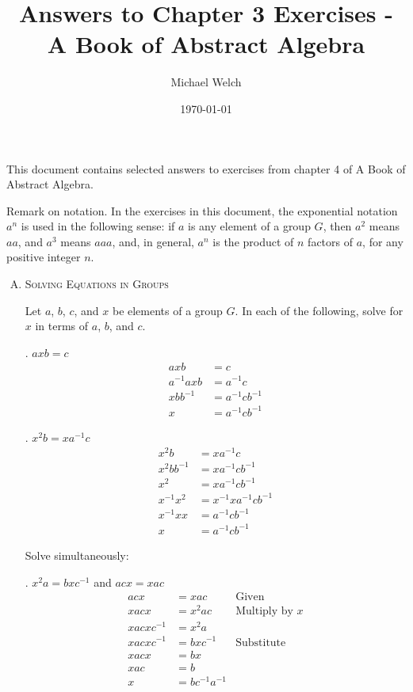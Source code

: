 \documentclass[twoside]{amsart}
\begin{document}
\title{Answers to Chapter 3 Exercises - A Book of Abstract Algebra}
\author{Michael Welch}
\date{\today}
\maketitle

This document contains selected answers to exercises from chapter 4
of A Book of Abstract Algebra.

Remark on notation. In the exercises in this document, the exponential
notation $a^n$ is used in the following sense: if $a$ is any element of
a group $G$, then $a^2$ means $aa$, and $a^3$ means $aaa$, and, in
general, $a^n$ is the product of $n$ factors of $a$, for any positive
integer $n$.

\begin{enumerate}[A.]
   \item \textsc{Solving Equations in Groups}

   \noindent Let $a$, $b$, $c$, and $x$ be elements of a group $G$. In each of
   the following, solve for $x$ in terms of $a$, $b$, and $c$.

   . $axb = c$
      \begin{align*}
         axb & = c \\
	 a^{-1}axb & = a^{-1}c \\
	 xbb^{-1} & = a^{-1}cb^{-1} \\
	 x & = a^{-1}cb^{-1}
      \end{align*}

   . $x^2b = xa^{-1}c$
      \begin{align*}
         x^2b & = xa^{-1}c    \\
	 x^2bb^{-1} & = xa^{-1}cb^{-1} \\
	 x^2        & = xa^{-1}cb^{-1} \\
	 x^{-1}x^2  & = x^{-1}xa^{-1}cb^{-1}\\
	 x^{-1}xx   & = a^{-1}cb^{-1} \\
	 x          & = a^{-1}cb^{-1}
      \end{align*}

   Solve simultaneously:

   . $x^2a = bxc^{-1}$ and $acx = xac$
   \begin{align*}
      acx & = xac      & \text{Given} \\
      xacx & = x^2ac   & \text{Multiply by $x$} \\
      xacxc^{-1} & = x^2a \\
      xacxc^{-1} & = bxc^{-1} & \text{Substitute} \\
      xacx       & = bx  \\
      xac        & = b  \\
      x          & = bc^{-1}a^{-1}
   \end{align*}


\end{enumerate}
\end{document}
